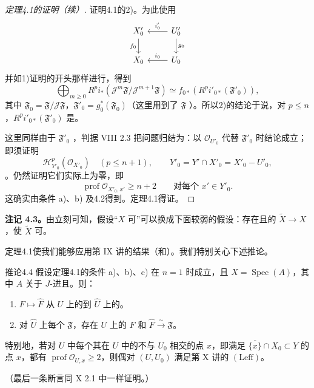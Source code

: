 \begin{proof}[定理4.1的证明（续）]
证明4.1的2)。为此使用
\[
\begin{tikzcd}
 X'_0\arrow[d,"f_0"'] & U'_0\arrow[l,"i'_0"']\arrow[d,"g_0"]\\
 X_0 & U_0\arrow[l,"i_0"']
\end{tikzcd}
\]
并如1)证明的开头那样进行，得到
\[
 \bigoplus_{m\geq0}R^pi_*(\mathcal J^m\mathfrak F/\mathcal J^{m+1}\mathfrak F)
 \simeq f_{0*}(R^pi'_{0*}(\mathfrak F'_0)),\tag{24}
\]
其中 $\mathfrak F_0=\mathfrak F/\mathcal J\mathfrak F$，$\mathfrak F'_0=g_0^*(\mathfrak F_0)$（这里用到了 $\mathfrak F$ ）。所以2)的结论于说，对 $p\leq n$，$R^pi'_{0*}(\mathfrak F'_0)$ 是。

这里同样由于 $\mathfrak F'_0$ ，判据 VIII 2.3 把问题归结为：以 $\mathcal O_{U'_0}$ 代替 $\mathfrak F'_0$ 时结论成立；即须证明
\[
 \mathcal H^p_{Y'_0}(\mathcal O_{X'_0})\quad(p\leq n+1),\qquad
 Y'_0=Y'\cap X'_0=X'_0-U'_0,
\]
。仍然证明它们实际上为零，即
\[
 \operatorname{prof}\mathcal O_{X'_0,x'}\geq n+2\qquad\text{对每个 }x'\in Y'_0.\tag{25}
\]
这确实由条件 a)、b) 及4.2得到。定理4.1得证。
\end{proof}
\textbf{注记 4.3。}由立刻可知，假设“$X$ 可”可以换成下面较弱的假设：存在且的 $\widetilde X\to X$，使 $\widetilde X$ 可。

定理4.1使我们能够应用第 IX 讲的结果（和）。我们特别关心下述推论。
\begin{SGAresult}{推论}{4.4}
假设定理4.1的条件 a)、b)、c) 在 $n=1$ 时成立，且 $X=\operatorname{Spec}(A)$，其中 $A$ 关于 $J$-进且。则：
\begin{enumerate}
\item[(1)]  $F\mapsto\widehat F$ 从 $U$ 上的到 $\widehat U$ 上的。
\item[(2)] 对 $\widehat U$ 上每个 $\mathfrak F$，存在 $U$ 上的 $F$ 和 $\widehat F\xrightarrow{\sim}\mathfrak F$。
\end{enumerate}
特别地，若对 $U$ 中每个其在 $U$ 中的不与 $U_0$ 相交的点 $x$，即满足 $\overline{\{x\}}\cap X_0\subset Y$ 的点 $x$，都有 $\operatorname{prof}\mathcal O_{U,x}\geq2$，则偶对 $(U,U_0)$ 满足第 X 讲的 $(\mathrm{Leff})$。
\end{SGAresult}
（最后一条断言同 X 2.1 中一样证明。）

